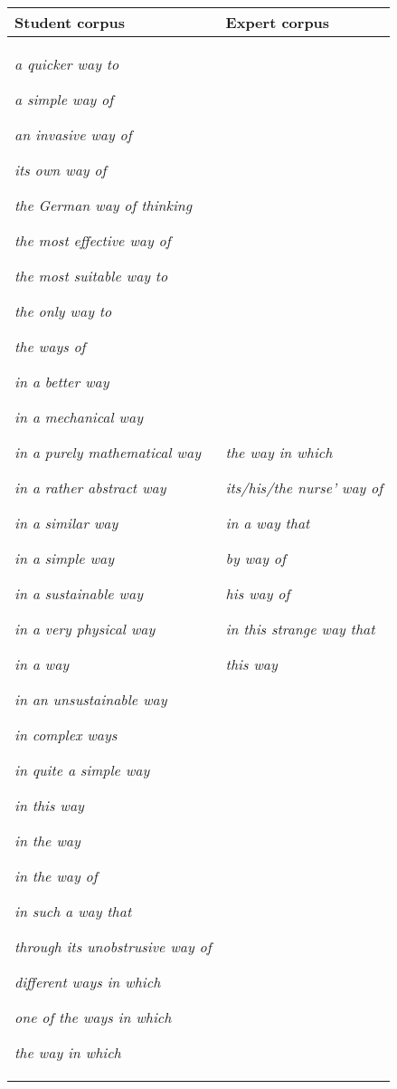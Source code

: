 \documentclass[output=paper]{langscibook}
\begin{document}
\begin{table}
\begin{tabularx}{\textwidth}{QQ}
\lsptoprule
Student corpus & Expert corpus\\\midrule
\textit{a quicker way to}

\textit{a simple way of}

\textit{an invasive way of}

\textit{its own way of}

\textit{the German way of thinking}

\textit{the most effective way of}

\textit{the most suitable way to}

\textit{the only way to}

\textit{the ways of}

\textit{in a better way}

\textit{in a mechanical way}

\textit{in a purely mathematical way}

\textit{in a rather abstract way}

\textit{in a similar way}

\textit{in a simple way}

\textit{in a sustainable way}

\textit{in a very physical way}

\textit{in a way}

\textit{in an unsustainable way}

\textit{in complex ways}

\textit{in quite a simple way}

\textit{in this way}

\textit{in the way}

\textit{in the way of}

\textit{in such a way that}

\textit{through its unobstrusive way of}

\textit{different ways in which}

\textit{one of the ways in which}

\textit{the way in which} & \textit{the way in which}

\textit{its/his/the nurse’ way of}

\textit{in a way that}

\textit{by way of}

\textit{his way of}

\textit{in this strange way that}

\textit{this way}


\end{tabularx}
\end{table}
\end{document}

